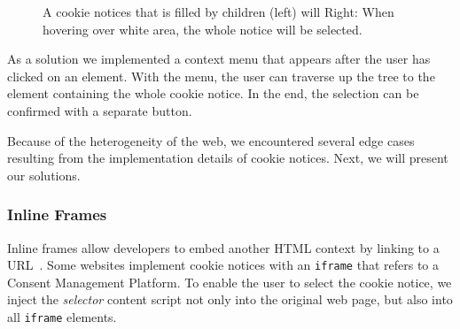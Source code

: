 \begin{figure}
	\centering
	\begin{minipage}{0.48\textwidth}
		\centering
	\end{minipage}\hfill
	\begin{minipage}{0.48\textwidth}
		\centering
	\end{minipage}
	\caption{A cookie notices that is filled by children (left) will Right: When hovering over white area, the whole notice will be selected.}
	\label{fig:notice-fillout}
\end{figure}

As a solution we implemented a context menu that appears after the user has clicked on an element.
With the menu, the user can traverse up the tree to the element containing the whole cookie notice.
In the end, the selection can be confirmed with a separate button.

Because of the heterogeneity of the web, we encountered several edge cases resulting from the implementation details of cookie notices. 
Next, we will present our solutions.

\subsubsection{Inline Frames}
Inline frames allow developers to embed another HTML context by linking to a URL~\cite{iframeMdn}.
Some websites implement cookie notices with an \verb|iframe| that refers to a Consent Management Platform.
To enable the user to select the cookie notice, we inject the \emph{selector} content script not only into the original web page, but also into all \verb|iframe| elements.

